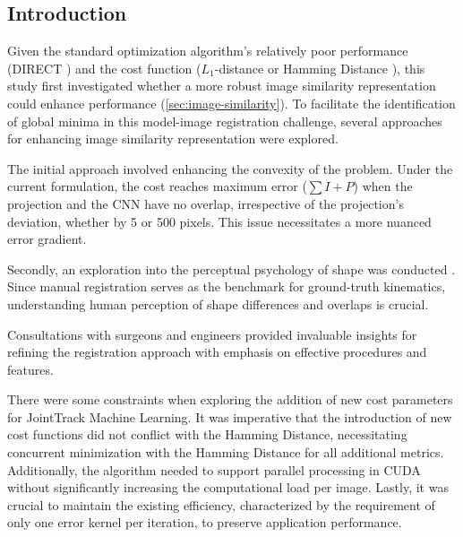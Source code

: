 \subsection{Introduction}
Given the standard optimization algorithm's relatively poor performance (DIRECT \cite{jonesLipschitzianOptimizationLipschitz1993,floodAutomatedRegistration3D2018}) and the cost function ($L_{1}$-distance or Hamming Distance \cite{floodAutomatedRegistration3D2018}), this study first investigated whether a more robust image similarity representation could enhance performance (\cref{sec:image-similarity}).
To facilitate the identification of global minima in this model-image registration challenge, several approaches for enhancing image similarity representation were explored.

The initial approach involved enhancing the convexity of the problem.
Under the current formulation, the cost reaches maximum error ($\sum I + P$) when the projection and the CNN have no overlap, irrespective of the projection's deviation, whether by 5 or 500 pixels.
This issue necessitates a more nuanced error gradient.

Secondly, an exploration into the perceptual psychology of shape was conducted \cite{attneaveInformationalAspectsVisual1954,attneaveQuantitativeStudyShape1956}.
Since manual registration serves as the benchmark for ground-truth kinematics, understanding human perception of shape differences and overlaps is crucial.

Consultations with surgeons and engineers provided invaluable insights for refining the registration approach with emphasis on effective procedures and features.

There were some constraints when exploring the addition of new cost parameters for JointTrack Machine Learning.
It was imperative that the introduction of new cost functions did not conflict with the Hamming Distance, necessitating concurrent minimization with the Hamming Distance for all additional metrics.
Additionally, the algorithm needed to support parallel processing in CUDA without significantly increasing the computational load per image.
Lastly, it was crucial to maintain the existing efficiency, characterized by the requirement of only one error kernel per iteration, to preserve application performance.
